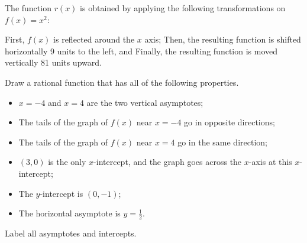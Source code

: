 \documentclass[11pt,answers]{exam}
\begin{document}
\begin{questions}
\question The function $r(x)$ is obtained by applying the following transformations on $\displaystyle f(x)=x^2$: 

 First, $f(x)$ is reflected around the $x$ axis;
	 Then, the resulting function is shifted horizontally 9 units to the left, and
 Finally, the resulting function is moved vertically 81 units upward.



\question[4]  Draw a rational function that has all of the following properties.
\begin{itemize}
	\item $x=-4$ and $x=4$ are the two vertical asymptotes;
	\item The tails of the graph of $f(x)$ near $x=-4$ go in opposite directions;
	\item The tails of the graph of $f(x)$ near $x=4$ go in the same direction;
	\item $(3,0)$ is the only $x$-intercept, and the graph goes across the $x$-axis at this $x$-intercept;
	\item The $y$-intercept is $(0,-1)$;
	\item The horizontal asymptote is $\displaystyle y=\frac{1}{2}$.
\end{itemize}
Label all asymptotes and intercepts.







\end{questions}
\end{document}
